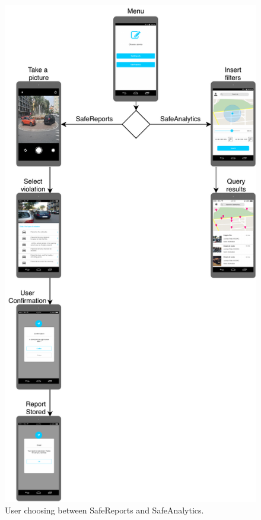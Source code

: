 \documentclass[./main.tex]{subfiles}
\begin{document}
\begin{figure}[H]
\centering
\includegraphics[width = 0.84 \textwidth]{resources/UXflow/uux}
\caption{ User choosing between SafeReports and SafeAnalytics.}
\end{figure}
\end{document}
